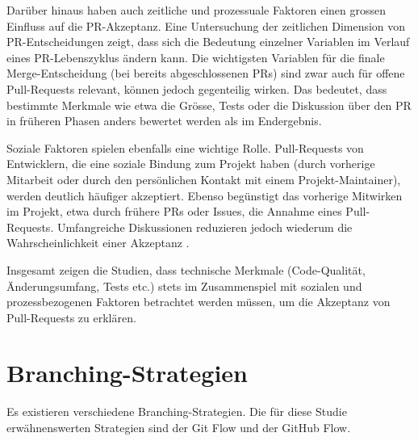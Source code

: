 Darüber hinaus haben auch zeitliche und prozessuale Faktoren einen grossen Einfluss auf die PR-Akzeptanz. Eine Untersuchung der zeitlichen Dimension von PR-Entscheidungen zeigt, dass sich die Bedeutung einzelner Variablen im Verlauf eines PR-Lebenszyklus ändern kann. Die wichtigsten Variablen für die finale Merge-Entscheidung (bei bereits abgeschlossenen PRs) sind zwar auch für offene Pull-Re\-quests relevant, können jedoch gegenteilig wirken. Das bedeutet, dass bestimmte Merkmale wie etwa die Grösse, Tests oder die Diskussion über den PR in früheren Phasen anders bewertet werden als im Endergebnis. \parencite{west_temporal_2023}

Soziale Faktoren spielen ebenfalls eine wichtige Rolle. Pull-Requests von Entwicklern, die eine soziale Bindung zum Projekt haben (durch vorherige Mitarbeit oder durch den persönlichen Kontakt mit einem Projekt-Maintainer), werden deutlich häufiger akzeptiert. Ebenso begünstigt das vorherige Mitwirken im Projekt, etwa durch frühere PRs oder Issues, die Annahme eines Pull-Requests. Umfangreiche Diskussionen reduzieren jedoch wiederum die Wahrscheinlichkeit einer Akzeptanz \parencite{tsay_influence_2014}.

Insgesamt zeigen die Studien, dass technische Merkmale (Code-Qualität, Änderungsumfang, Tests etc.) stets im Zusammenspiel mit sozialen und prozessbezogenen Faktoren betrachtet werden müssen, um die Akzeptanz von Pull-Requests zu erklären.

\section{Branching-Strategien}
Es existieren verschiedene Branching-Strategien. Die für diese Studie erwähnenswerten Strategien sind der Git Flow und der GitHub Flow. \parencite{priyanka_gowdaashwath_narayana_gowda_git-branching-and-release-strategies_2022} 
